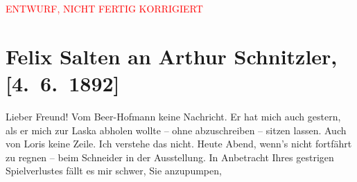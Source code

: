 
\begin{center}
            \textcolor{red}{ENTWURF, NICHT FERTIG KORRIGIERT}
                      \end{center}
            
         
         \renewcommand{\erwaehntePersonen}{Personen: Richard Beer-Hofmann, Hugo von Hofmannsthal, Julie Laska, Philipp Salzmann}
         \renewcommand{\erwaehnteInstitutionen}{Institutionen: Wiener Musik- und Theaterausstellung 1892}
         \renewcommand{\erwaehnteOrte}{Orte: Café Kremser, Café Schneider, Wien}
         \renewcommand{\erwaehnteWerke}{Werke: Muza}
               \section[Felix Salten an Arthur Schnitzler, {[}4. 6. 1892{]}]{ Felix Salten an Arthur Schnitzler, {[}4. 6. 1892{]}}\nopagebreak{}\rehead{ }\begin{ledgroupsized}[t]{13cm}\normalsize\beginnumbering \toendnotes[C]{\smallbreak\pagebreak[2]} 
\toendnotes[C]{\smallbreak}\pstart
           \noindent{}{\pb}Lieber Freund! Vom Beer-Hofmann keine Nachricht. Er hat mich auch gestern, als er mich zur Laska abholen wollte – ohne abzuschreiben –
               sitzen lassen. Auch von Loris keine Zeile. Ich
               verstehe das nicht. \pend
           \pstart
           Heute Abend, wenn’s nicht {\pb}fortfährt zu regnen – beim Schneider in der
                  Ausstellung.\pend
           \pstart
           In Anbetracht Ihres gestrigen Spielverlustes fällt es mir schwer, Sie anzupumpen,

\end{ledgroupsized}
